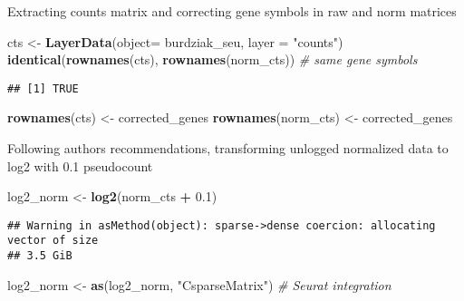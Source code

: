 \documentclass[
]{article}
\newenvironment{Shaded}{\begin{snugshade}}{\end{snugshade}}
\newcommand{\AttributeTok}[1]{\textcolor[rgb]{0.13,0.29,0.53}{#1}}
\newcommand{\CommentTok}[1]{\textcolor[rgb]{0.56,0.35,0.01}{\textit{#1}}}
\newcommand{\FloatTok}[1]{\textcolor[rgb]{0.00,0.00,0.81}{#1}}
\newcommand{\FunctionTok}[1]{\textcolor[rgb]{0.13,0.29,0.53}{\textbf{#1}}}
\newcommand{\NormalTok}[1]{#1}
\newcommand{\OtherTok}[1]{\textcolor[rgb]{0.56,0.35,0.01}{#1}}
\newcommand{\SpecialCharTok}[1]{\textcolor[rgb]{0.81,0.36,0.00}{\textbf{#1}}}
\newcommand{\StringTok}[1]{\textcolor[rgb]{0.31,0.60,0.02}{#1}}
\begin{document}
Extracting counts matrix and correcting gene symbols in raw and norm
matrices

\begin{Shaded}
\begin{Highlighting}[]
\NormalTok{cts }\OtherTok{\textless{}{-}} \FunctionTok{LayerData}\NormalTok{(}\AttributeTok{object=}\NormalTok{ burdziak\_seu, }\AttributeTok{layer =} \StringTok{"counts"}\NormalTok{) }
\FunctionTok{identical}\NormalTok{(}\FunctionTok{rownames}\NormalTok{(cts), }\FunctionTok{rownames}\NormalTok{(norm\_cts)) }\CommentTok{\# same gene symbols}
\end{Highlighting}
\end{Shaded}

\begin{verbatim}
## [1] TRUE
\end{verbatim}

\begin{Shaded}
\begin{Highlighting}[]
\FunctionTok{rownames}\NormalTok{(cts) }\OtherTok{\textless{}{-}}\NormalTok{ corrected\_genes }
\FunctionTok{rownames}\NormalTok{(norm\_cts) }\OtherTok{\textless{}{-}}\NormalTok{ corrected\_genes}
\end{Highlighting}
\end{Shaded}

Following authors recommendations, transforming unlogged normalized data
to log2 with 0.1 pseudocount

\begin{Shaded}
\begin{Highlighting}[]
\NormalTok{log2\_norm }\OtherTok{\textless{}{-}} \FunctionTok{log2}\NormalTok{(norm\_cts }\SpecialCharTok{+} \FloatTok{0.1}\NormalTok{)}
\end{Highlighting}
\end{Shaded}

\begin{verbatim}
## Warning in asMethod(object): sparse->dense coercion: allocating vector of size
## 3.5 GiB
\end{verbatim}

\begin{Shaded}
\begin{Highlighting}[]
\NormalTok{log2\_norm }\OtherTok{\textless{}{-}} \FunctionTok{as}\NormalTok{(log2\_norm, }\StringTok{"CsparseMatrix"}\NormalTok{) }\CommentTok{\# Seurat integration}
\end{Highlighting}
\end{Shaded}
\end{document}

